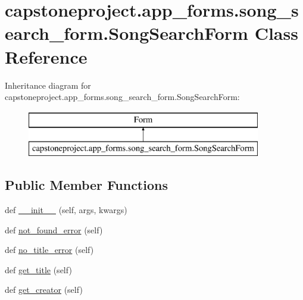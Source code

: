 \hypertarget{classcapstoneproject_1_1app__forms_1_1song__search__form_1_1_song_search_form}{}\section{capstoneproject.\+app\+\_\+forms.\+song\+\_\+search\+\_\+form.\+Song\+Search\+Form Class Reference}
\label{classcapstoneproject_1_1app__forms_1_1song__search__form_1_1_song_search_form}
Inheritance diagram for capstoneproject.\+app\+\_\+forms.\+song\+\_\+search\+\_\+form.\+Song\+Search\+Form\+:\begin{figure}[H]
\begin{center}
\leavevmode
\includegraphics[height=2.000000cm]{classcapstoneproject_1_1app__forms_1_1song__search__form_1_1_song_search_form}
\end{center}
\end{figure}
\subsection*{Public Member Functions}
\begin{DoxyCompactItemize}
\item 
def \mbox{\hyperlink{classcapstoneproject_1_1app__forms_1_1song__search__form_1_1_song_search_form_ad118522ef9949020196eacabd1cce387}{\+\_\+\+\_\+init\+\_\+\+\_\+}} (self, args, kwargs)
\item 
def \mbox{\hyperlink{classcapstoneproject_1_1app__forms_1_1song__search__form_1_1_song_search_form_ab92b660f243698283f1a87a3b89d761c}{not\+\_\+found\+\_\+error}} (self)
\item 
def \mbox{\hyperlink{classcapstoneproject_1_1app__forms_1_1song__search__form_1_1_song_search_form_a5bde0a30f8d29a71c219f7661269cfef}{no\+\_\+title\+\_\+error}} (self)
\item 
def \mbox{\hyperlink{classcapstoneproject_1_1app__forms_1_1song__search__form_1_1_song_search_form_ad7cbed83e48311f676225330b16eb316}{get\+\_\+title}} (self)
\item 
def \mbox{\hyperlink{classcapstoneproject_1_1app__forms_1_1song__search__form_1_1_song_search_form_aeffde805cce0affdd12c12781c9c2f27}{get\+\_\+creator}} (self)
\end{DoxyCompactItemize}
